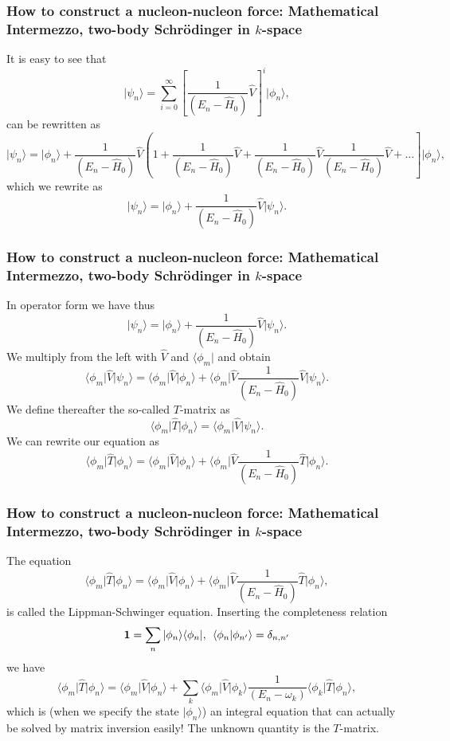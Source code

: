 \documentclass[compress]{beamer}
\begin{document}
\frame
{
\frametitle{How to construct a nucleon-nucleon force: Mathematical Intermezzo, two-body Schr\"odinger in $k$-space}
\begin{small}
{\scriptsize
It is easy to see that 
\[
\vert \psi_n \rangle =\sum_{i=0}^{\infty}\left[\frac{1}{(E_n -\hat{H}_0)}\hat{V}\right]^i\vert \phi_n \rangle,
\]
can be rewritten as 
\[
\vert \psi_n \rangle =\vert\phi_n \rangle+\frac{1}{( E_n -\hat{H}_0)}
\hat{V}\left(1+ \frac{1}{(E_n -\hat{H}_0)}\hat{V}+\frac{1}{(E_n -\hat{H}_0)}\hat{V}\frac{1}{(E_n -\hat{H}_0)}\hat{V}+\dots\right]\vert \phi_n \rangle,
\]
which we rewrite as 
\[
\vert \psi_n \rangle =\vert\phi_n \rangle+\frac{1}{(E_n -\hat{H}_0)}\hat{V}\vert \psi_n \rangle.
\]


}
\end{small}
}



\frame
{
\frametitle{How to construct a nucleon-nucleon force: Mathematical Intermezzo, two-body Schr\"odinger in $k$-space}
\begin{small}
{\scriptsize
In operator form we have thus
\[
\vert \psi_n \rangle =\vert\phi_n \rangle+\frac{1}{(E_n -\hat{H}_0)}\hat{V}\vert \psi_n \rangle.
\]
We multiply from the left with $\hat{V}$ and $\langle \phi_m \vert$ and obtain
\[
\langle \phi_m \vert\hat{V}\vert \psi_n \rangle =\langle \phi_m \vert\hat{V}\vert\phi_n \rangle+\langle \phi_m \vert\hat{V}\frac{1}{(E_n -\hat{H}_0)}\hat{V}\vert \psi_n \rangle.
\]
We define thereafter the so-called $T$-matrix as
\[
\langle \phi_m \vert\hat{T}\vert \phi_n \rangle=\langle \phi_m \vert\hat{V}\vert \psi_n \rangle.
\]
We can rewrite our equation as
\[
\langle \phi_m \vert\hat{T}\vert \phi_n \rangle =\langle \phi_m \vert\hat{V}\vert\phi_n \rangle+\langle \phi_m \vert\hat{V}\frac{1}{(E_n -\hat{H}_0)}\hat{T}\vert \phi_n \rangle.
\]


}
\end{small}
}



\frame
{
\frametitle{How to construct a nucleon-nucleon force: Mathematical Intermezzo, two-body Schr\"odinger in $k$-space}
\begin{small}
{\scriptsize
The equation
\[
\langle \phi_m \vert\hat{T}\vert \phi_n \rangle =\langle \phi_m \vert\hat{V}\vert\phi_n \rangle+\langle \phi_m \vert\hat{V}\frac{1}{(E_n -\hat{H}_0)}\hat{T}\vert \phi_n \rangle,
\]
is called the Lippman-Schwinger equation. Inserting the completeness relation
\[ 
{\bf 1} = \sum_n \vert \phi_n\rangle\langle \phi_n \vert, \:\: \langle \phi_n\vert \phi_{n'} \rangle = \delta_{n,n'}
\]
we have 
\[
\langle \phi_m \vert\hat{T}\vert \phi_n \rangle =\langle \phi_m \vert\hat{V}\vert\phi_n \rangle+\sum_k \langle \phi_m \vert\hat{V}\vert \phi_k\rangle\frac{1}{(E_n -\omega_k)}\langle \phi_k \vert\hat{T}\vert \phi_n \rangle,
\]
which is (when we specify the state $\vert\phi_n \rangle$) an integral equation that can actually be solved by matrix inversion easily! The unknown quantity is the $T$-matrix.

}
\end{small}
}
\end{document}
